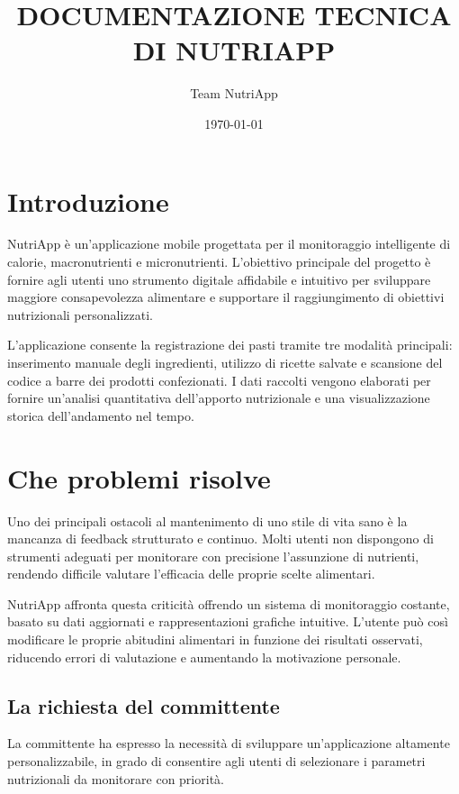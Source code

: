 \documentclass[a4paper,12pt]{article}
\title{\textbf{DOCUMENTAZIONE TECNICA DI NUTRIAPP}}
\author{Team NutriApp}
\date{\today}
\begin{document}
    \maketitle
    \tableofcontents
    \newpage

    \section{Introduzione}

    NutriApp è un'applicazione mobile progettata per il monitoraggio intelligente di calorie, macronutrienti e micronutrienti.
    L'obiettivo principale del progetto è fornire agli utenti uno strumento digitale affidabile e intuitivo per sviluppare maggiore consapevolezza alimentare e supportare il raggiungimento di obiettivi nutrizionali personalizzati.

    L'applicazione consente la registrazione dei pasti tramite tre modalità principali: inserimento manuale degli ingredienti, utilizzo di ricette salvate e scansione del codice a barre dei prodotti confezionati. I dati raccolti vengono elaborati per fornire un'analisi quantitativa dell'apporto nutrizionale e una visualizzazione storica dell'andamento nel tempo.

    \section{Che problemi risolve}

    Uno dei principali ostacoli al mantenimento di uno stile di vita sano è la mancanza di feedback strutturato e continuo. Molti utenti non dispongono di strumenti adeguati per monitorare con precisione l'assunzione di nutrienti, rendendo difficile valutare l'efficacia delle proprie scelte alimentari.

    NutriApp affronta questa criticità offrendo un sistema di monitoraggio costante, basato su dati aggiornati e rappresentazioni grafiche intuitive. L'utente può così modificare le proprie abitudini alimentari in funzione dei risultati osservati, riducendo errori di valutazione e aumentando la motivazione personale.

    \subsection{La richiesta del committente}

    La committente ha espresso la necessità di sviluppare un'applicazione altamente personalizzabile, in grado di consentire agli utenti di selezionare i parametri nutrizionali da monitorare con priorità.
\end{document}
